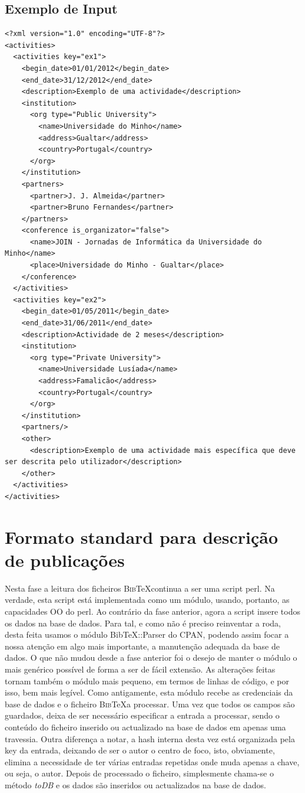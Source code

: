 \documentclass[a4paper,11pt,openright,openbib]{article}
\begin{document}
\subsection{Exemplo de Input}
\begin{verbatim}
<?xml version="1.0" encoding="UTF-8"?>
<activities>
  <activities key="ex1">
    <begin_date>01/01/2012</begin_date>
    <end_date>31/12/2012</end_date>
    <description>Exemplo de uma actividade</description>
    <institution>
      <org type="Public University">
        <name>Universidade do Minho</name>
        <address>Gualtar</address>
        <country>Portugal</country>
      </org>
    </institution>
    <partners>
      <partner>J. J. Almeida</partner>
      <partner>Bruno Fernandes</partner>
    </partners>
    <conference is_organizator="false">
      <name>JOIN - Jornadas de Informática da Universidade do Minho</name>
      <place>Universidade do Minho - Gualtar</place>
    </conference>
  </activities>
  <activities key="ex2">
    <begin_date>01/05/2011</begin_date>
    <end_date>31/06/2011</end_date>
    <description>Actividade de 2 meses</description>
    <institution>
      <org type="Private University">
        <name>Universidade Lusíada</name>
        <address>Famalicão</address>
        <country>Portugal</country>
      </org>
    </institution>
    <partners/>
    <other>
      <description>Exemplo de uma actividade mais específica que deve ser descrita pelo utilizador</description>
    </other>
  </activities>
</activities>
\end{verbatim}

\section{Formato standard para descrição de publicações}
Nesta fase a leitura dos ficheiros \textsc{Bib}\negthinspace\TeX continua a ser uma script perl. Na verdade, esta script está implementada como um módulo, usando, portanto, as capacidades OO do perl. Ao contrário da fase anterior, agora a script insere todos os dados na base de dados. Para tal, e como não é preciso reinventar a roda, desta feita usamos o módulo BibTeX::Parser do CPAN, podendo assim focar a nossa atenção em algo mais importante, a manutenção adequada da base de dados. O que não mudou desde a fase anterior foi o desejo de manter o módulo o mais genérico possível de forma a ser de fácil extensão. As alterações feitas tornam também o módulo mais pequeno, em termos de linhas de código, e por isso, bem mais legível. Como antigamente, esta módulo recebe as credenciais da base de dados e o ficheiro \textsc{Bib}\negthinspace\TeX a processar. Uma vez que todos os campos são guardados, deixa de ser necessário especificar a entrada a processar, sendo o conteúdo do ficheiro inserido ou actualizado na base de dados em apenas uma travessia. Outra diferença a notar, a hash interna desta vez está organizada pela key da entrada, deixando de ser o autor o centro de foco, isto, obviamente, elimina a necessidade de ter várias entradas repetidas onde muda apenas a chave, ou seja, o autor. Depois de processado o ficheiro, simplesmente chama-se o método \textit{toDB} e os dados são inseridos ou actualizados na base de dados.
\end{document}
